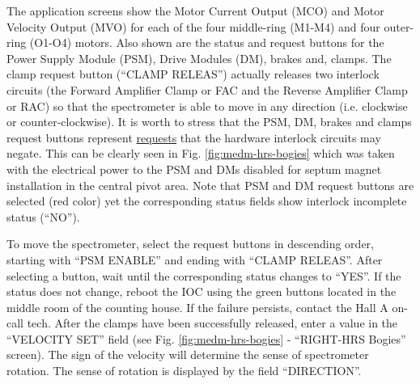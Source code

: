{The application screens show the Motor Current Output (MCO) and Motor Velocity Output (MVO) for each
of the four middle-ring (M1-M4) and four outer-ring (O1-O4) motors.
Also shown are the status and request buttons for the Power Supply Module (PSM),
Drive Modules (DM),
brakes and, clamps. The clamp request button (``CLAMP RELEAS'') actually releases two interlock
circuits (the Forward Amplifier Clamp or FAC and the Reverse Amplifier Clamp or RAC)
so that the spectrometer is
able to move in any direction (i.e. clockwise or counter-clockwise).
It is worth to stress that the PSM, DM, brakes and clamps request buttons represent
\underline{requests} that the hardware interlock circuits may negate. This can be clearly
seen 
in Fig. \ref{fig:medm-hrs-bogies} which was taken with
the electrical power to the PSM and DMs disabled for septum magnet installation
in the central pivot area. Note that PSM and DM request buttons are selected (red color)
yet the corresponding status fields show interlock incomplete status (``NO'').

To move the spectrometer, select the request buttons in descending order, starting with
``PSM ENABLE'' and ending with ``CLAMP RELEAS''. After selecting a button, wait
until the corresponding status changes to ``YES''. 
If the status does not change, reboot
the IOC using the green buttons located in the middle room of the counting house.
If the failure persists, contact the Hall A on-call tech.
After the clamps have been successfully released, enter a value in the ``VELOCITY SET'' field
(see Fig. \ref{fig:medm-hrs-bogies} - ``RIGHT-HRS Bogies'' screen).
The sign of the velocity
will determine the sense of spectrometer rotation. The sense of rotation is displayed by the
field ``DIRECTION''.

}
